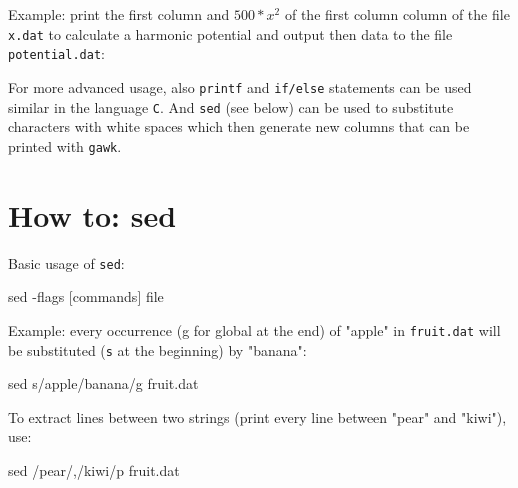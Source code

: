 \documentclass[
  letterpaper,
  DIV=11,
  numbers=noendperiod]{scrreprt}
\newenvironment{Shaded}{\begin{snugshade}}{\end{snugshade}}
\newcommand{\AttributeTok}[1]{\textcolor[rgb]{0.40,0.45,0.13}{#1}}
\newcommand{\FunctionTok}[1]{\textcolor[rgb]{0.28,0.35,0.67}{#1}}
\newcommand{\NormalTok}[1]{\textcolor[rgb]{0.00,0.23,0.31}{#1}}
\newcommand{\OperatorTok}[1]{\textcolor[rgb]{0.37,0.37,0.37}{#1}}
\newcommand{\StringTok}[1]{\textcolor[rgb]{0.13,0.47,0.30}{#1}}
\begin{document}
Example: print the first column and \(500*x^2\) of the first column
column of the file \texttt{x.dat} to calculate a harmonic potential and
output then data to the file \texttt{potential.dat}:

\begin{Shaded}
\end{Shaded}

For more advanced usage, also \texttt{printf} and \texttt{if/else}
statements can be used similar in the language \texttt{C}. And
\texttt{sed} (see below) can be used to substitute characters with white
spaces which then generate new columns that can be printed with
\texttt{gawk}.

\hypertarget{how-to-sed}{%
\chapter*{How to: sed}\label{how-to-sed}}


Basic usage of \texttt{sed}:

\begin{Shaded}
\begin{Highlighting}[]
\FunctionTok{sed} \AttributeTok{{-}flags} \StringTok{\textquotesingle{}[commands]\textquotesingle{}}\NormalTok{ file}
\end{Highlighting}
\end{Shaded}

Example: every occurrence (g for global at the end) of "apple" in
\texttt{fruit.dat} will be substituted (\texttt{s} at the beginning) by
"banana":

\begin{Shaded}
\begin{Highlighting}[]
\FunctionTok{sed} \StringTok{\textquotesingle{}s/apple/banana/g\textquotesingle{}}\NormalTok{ fruit.dat}
\end{Highlighting}
\end{Shaded}

To extract lines between two strings (print every line between "pear"
and "kiwi"), use:

\begin{Shaded}
\begin{Highlighting}[]
\FunctionTok{sed} \StringTok{\textquotesingle{}/pear/,/kiwi/p\textquotesingle{}}\NormalTok{ fruit.dat}
\end{Highlighting}
\end{Shaded}
\end{document}
